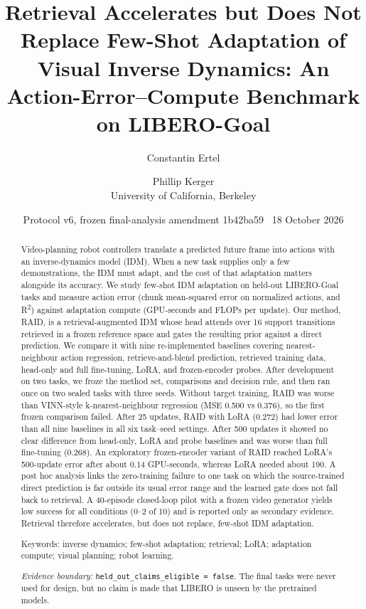 \documentclass[11pt,a4paper]{article}
\title{\textbf{Retrieval Accelerates but Does Not Replace Few-Shot Adaptation of Visual Inverse Dynamics: An Action-Error–Compute Benchmark on LIBERO-Goal}}
\author{Constantin Ertel \and Phillip Kerger\\ University of California, Berkeley}
\date{Protocol v6, frozen final-analysis amendment 1b42ba59 \textbar\ 18 October 2026}
\begin{document}
\maketitle

\begin{abstract}

Video-planning robot controllers translate a predicted future frame into actions with an inverse-dynamics model (IDM). When a new task supplies only a few demonstrations, the IDM must adapt, and the cost of that adaptation matters alongside its accuracy. We study few-shot IDM adaptation on held-out LIBERO-Goal tasks and measure action error (chunk mean-squared error on normalized actions, and R\textsuperscript{2}) against adaptation compute (GPU-seconds and FLOPs per update). Our method, RAID, is a retrieval-augmented IDM whose head attends over 16 support transitions retrieved in a frozen reference space and gates the resulting prior against a direct prediction. We compare it with nine re-implemented baselines covering nearest-neighbour action regression, retrieve-and-blend prediction, retrieved training data, head-only and full fine-tuning, LoRA, and frozen-encoder probes. After development on two tasks, we froze the method set, comparisons and decision rule, and then ran once on two sealed tasks with three seeds. Without target training, RAID was worse than VINN-style k-nearest-neighbour regression (MSE 0.500 vs 0.376), so the first frozen comparison failed. After 25 updates, RAID with LoRA (0.272) had lower error than all nine baselines in all six task--seed settings. After 500 updates it showed no clear difference from head-only, LoRA and probe baselines and was worse than full fine-tuning (0.268). An exploratory frozen-encoder variant of RAID reached LoRA's 500-update error after about 0.14 GPU-seconds, whereas LoRA needed about 190. A post hoc analysis links the zero-training failure to one task on which the source-trained direct prediction is far outside its usual error range and the learned gate does not fall back to retrieval. A 40-episode closed-loop pilot with a frozen video generator yields low success for all conditions (0--2 of 10) and is reported only as secondary evidence. Retrieval therefore accelerates, but does not replace, few-shot IDM adaptation.


\noindent Keywords: inverse dynamics; few-shot adaptation; retrieval; LoRA; adaptation compute; visual planning; robot learning.

\noindent\textit{Evidence boundary:} \texttt{held\_out\_claims\_eligible = false}. The final tasks were never used for design, but no claim is made that LIBERO is unseen by the pretrained models.

\end{abstract}
\end{document}
